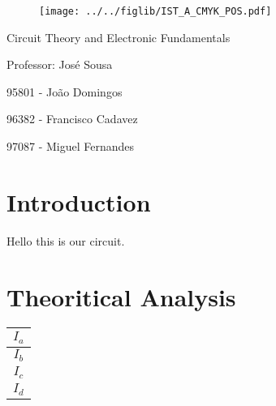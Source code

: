 \documentclass[11pt]{article}
\begin{document}
\begin{figure}[h]
	\centering
	\texttt{[image: ../../figlib/IST\_A\_CMYK\_POS.pdf]}
\end{figure}

\begin{center}
	\huge{Circuit Theory and Electronic Fundamentals}
	
	\large{Professor: José Sousa}
	
	\large{95801 - João Domingos}
	
	\large{96382 - Francisco Cadavez}
	
	\large{97087 - Miguel Fernandes}
\end{center}

\section{Introduction}
Hello this is our circuit.


\section{Theoritical Analysis}

\begin{center}
    \begin{minipage}{.3\textwidth}
        \flushright
        \begin{tabular}{|c|}
            \hline
            $I_a$ \\
            \hline
            $I_b$ \\
            \hline
            $I_c$ \\
            \hline
            $I_d$ \\
            \hline
        \end{tabular}
    \end{minipage}
    \begin{minipage}{.3\textwidth}
        \flushleft
        
    \end{minipage}
\end{center}
\end{document}
